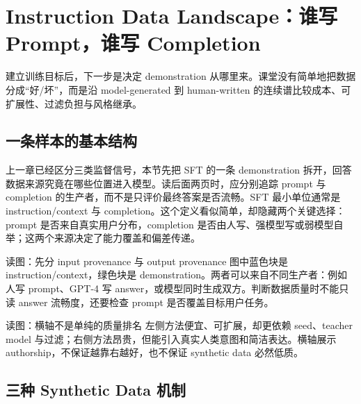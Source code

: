 \section{Instruction Data Landscape：谁写 Prompt，谁写 Completion}

建立训练目标后，下一步是决定 demonstration 从哪里来。课堂没有简单地把数据分成“好/坏”，而是沿 model-generated 到 human-written 的连续谱比较成本、可扩展性、过滤负担与风格继承。

\subsection{一条样本的基本结构}

上一章已经区分三类监督信号，本节先把 SFT 的一条 demonstration 拆开，回答数据来源究竟在哪些位置进入模型。读后面两页时，应分别追踪 prompt 与 completion 的生产者，而不是只评价最终答案是否流畅。SFT 最小单位通常是 instruction/context 与 completion。这个定义看似简单，却隐藏两个关键选择：prompt 是否来自真实用户分布，completion 是否由人写、强模型写或弱模型自举；这两个来源决定了能力覆盖和偏差传递。


\begin{knowledgebox}{读图：先分 input provenance 与 output provenance}
图中蓝色块是 instruction/context，绿色块是 demonstration。两者可以来自不同生产者：例如人写 prompt、GPT-4 写 answer，或模型同时生成双方。判断数据质量时不能只读 answer 流畅度，还要检查 prompt 是否覆盖目标用户任务。
\end{knowledgebox}


\begin{knowledgebox}{读图：横轴不是单纯的质量排名}
左侧方法便宜、可扩展，却更依赖 seed、teacher model 与过滤；右侧方法昂贵，但能引入真实人类意图和简洁表达。横轴展示 authorship，不保证越靠右越好，也不保证 synthetic data 必然低质。
\end{knowledgebox}


\subsection{三种 Synthetic Data 机制}

